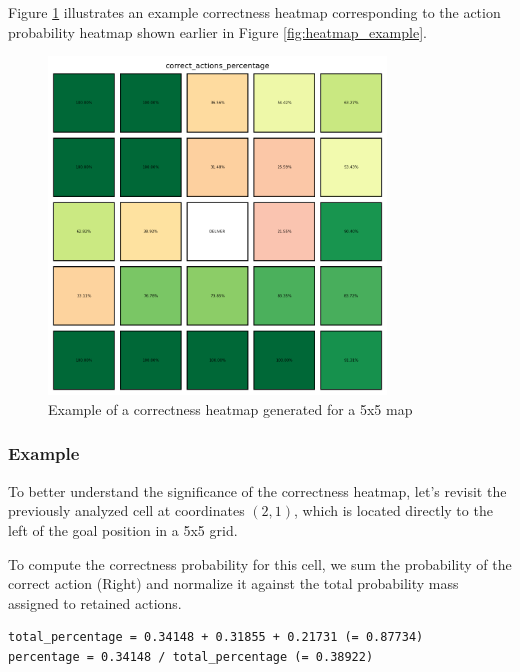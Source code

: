 Figure \ref{fig:correctness_example} illustrates an example correctness heatmap
corresponding to the action probability heatmap shown earlier in Figure
\ref{fig:heatmap_example}.

\begin{figure}[ht!]
  \centering
  \includegraphics[width=0.8\textwidth]{
    images/data_collection/correctness_example.png
  }
  \caption{Example of a correctness heatmap generated for a 5x5 map}
  \label{fig:correctness_example}
\end{figure}

\subsubsection{Example}

To better understand the significance of the correctness heatmap, let's revisit the
previously analyzed cell at coordinates $(2,1)$, which is located directly to
the left of the goal position in a 5x5 grid.

To compute the correctness probability for this cell, we sum the probability of the
correct action (Right) and normalize it against the total probability mass assigned
to retained actions.

\vspace{5mm}
\begin{codewindow}
  [Text] 
  \begin{lstlisting}
total_percentage = 0.34148 + 0.31855 + 0.21731 (= 0.87734)
percentage = 0.34148 / total_percentage (= 0.38922)
\end{lstlisting}
\end{codewindow}
\vspace{5mm}

